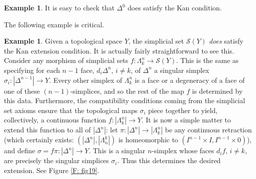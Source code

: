 \documentclass[12pt]{article}
\theoremstyle{plain}
\theoremstyle{definition}
\newtheorem{example}[theorem]{Example}
\newcommand{\ms}[1]{\mathscr{#1}}
\begin{document}
\begin{example}
It is easy to check that $\Delta^0$ does satisfy the Kan condition.
\end{example}

The following example is critical. 

\begin{example}\label{E: simp Kan}
Given a topological space $Y$, the simplicial set $\ms S(Y)$ \emph{does} satisfy the Kan extension condition. It is actually fairly straightforward to see this. Consider any morphism of simplicial sets $f\colon\Lambda^n_k\to \ms S(Y)$. This is the same as specifying for each $n-1$ face, $d_i\Delta^n$, $i\neq k$, of $\Delta^n$ a singular simplex $\sigma_i\colon|\Delta^{n-1}|\to Y$. Every other simplex of $\Lambda^n_k$ is a face or a degeneracy of a face of one of these $(n-1)$-simplices, and so the rest of the map $f$ is determined by this data. Furthermore, the compatibility conditions coming from the simplicial set axioms ensure that the topological maps $\sigma_i$ piece together to yield, collectively, a continuous function $f\colon|\Lambda^n_k|\to Y$. It is now a simple matter to extend this function to all of $|\Delta^n|$: let $\pi\colon|\Delta^n|\to |\Lambda^n_k|$ be any continuous retraction (which certainly exists: $(|\Delta^n|,|\Lambda^k_n|)$ is homeomorphic to $(I^{n-1}\times I,I^{n-1}\times 0)$), and define $\sigma=f \pi\colon|\Delta^n|\to Y$. This is a singular $n$-simplex whose faces $d_if$, $i\neq k$, are precisely the singular simplices $\sigma_i$. Thus this determines the desired extension. See Figure \ref{F: fig19}.
\end{example}
\end{document}
